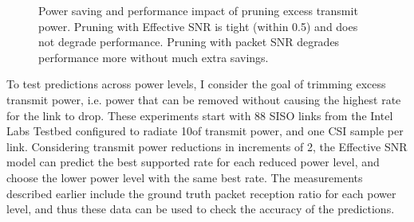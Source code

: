 \begin{figure}[t]
      \centering
      \caption[Impact of pruning excess transmit power]{\label{fig:power_save_1x1} Power saving and performance impact of pruning excess transmit power. Pruning with Effective SNR is tight (within 0.5\dB) and does not degrade performance. Pruning with packet SNR degrades performance more without much extra savings.} 
\end{figure}

To test predictions across power levels, I consider the goal of trimming excess transmit power, i.e. power that can be removed without causing the highest rate for the link to drop. These experiments start with 88 SISO links from the Intel Labs Testbed configured to radiate 10\mW of transmit power, and one CSI sample per link. Considering transmit power reductions in increments of 2\dB, the Effective SNR model can predict the best supported rate for each reduced power level, and choose the lower power level with the same best rate. The measurements described earlier include the ground truth packet reception ratio for each power level, and thus these data can be used to check the accuracy of the predictions.


